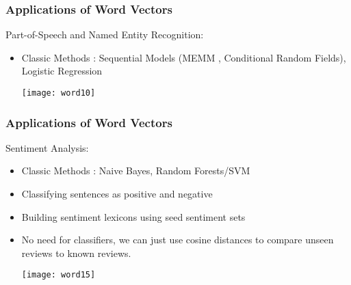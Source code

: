 \begin{frame}[fragile]\frametitle{Applications of Word Vectors}
Part-of-Speech and Named Entity Recognition:

\begin{itemize}
\item Classic Methods :  Sequential Models (MEMM , Conditional Random Fields),  Logistic Regression
\begin{center}
\texttt{[image: word10]}
\end{center}
\end{itemize}
\end{frame}
%
%

\begin{frame}[fragile]\frametitle{Applications of Word Vectors}
Sentiment Analysis:
\begin{itemize}
\item Classic Methods : Naive Bayes, Random Forests/SVM
\item Classifying sentences as positive and negative
\item Building sentiment lexicons using seed sentiment sets
\item No need for classifiers, we can just use cosine distances to compare unseen reviews to known reviews.

\begin{center}
\texttt{[image: word15]}
\end{center}
\end{itemize}
\end{frame}

